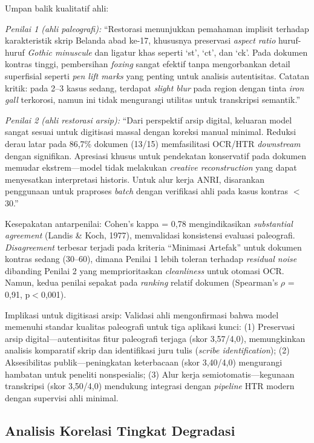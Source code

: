 \documentclass[journal]{IEEEtran}
\begin{document}
Umpan balik kualitatif ahli:

\textit{Penilai 1 (ahli paleografi):} ``Restorasi menunjukkan pemahaman implisit terhadap karakteristik skrip Belanda abad ke-17, khususnya preservasi \textit{aspect ratio} huruf-huruf \textit{Gothic minuscule} dan ligatur khas seperti `st', `ct', dan `ck'. Pada dokumen kontras tinggi, pembersihan \textit{foxing} sangat efektif tanpa mengorbankan detail superfisial seperti \textit{pen lift marks} yang penting untuk analisis autentisitas. Catatan kritik: pada 2--3 kasus sedang, terdapat \textit{slight blur} pada region dengan tinta \textit{iron gall} terkorosi, namun ini tidak mengurangi utilitas untuk transkripsi semantik.''

\textit{Penilai 2 (ahli restorasi arsip):} ``Dari perspektif arsip digital, keluaran model sangat sesuai untuk digitisasi massal dengan koreksi manual minimal. Reduksi derau latar pada 86,7\% dokumen (13/15) memfasilitasi OCR/HTR \textit{downstream} dengan signifikan. Apresiasi khusus untuk pendekatan konservatif pada dokumen memudar ekstrem---model tidak melakukan \textit{creative reconstruction} yang dapat menyesatkan interpretasi historis. Untuk alur kerja ANRI, disarankan penggunaan untuk praproses \textit{batch} dengan verifikasi ahli pada kasus kontras $<$30.''

Kesepakatan antarpenilai: Cohen's kappa = 0,78 mengindikasikan \textit{substantial agreement} (Landis \& Koch, 1977), memvalidasi konsistensi evaluasi paleografi. \textit{Disagreement} terbesar terjadi pada kriteria ``Minimasi Artefak'' untuk dokumen kontras sedang (30--60), dimana Penilai 1 lebih toleran terhadap \textit{residual noise} dibanding Penilai 2 yang memprioritaskan \textit{cleanliness} untuk otomasi OCR. Namun, kedua penilai sepakat pada \textit{ranking} relatif dokumen (Spearman's $\rho$ = 0,91, p$<$0,001).

Implikasi untuk digitisasi arsip: Validasi ahli mengonfirmasi bahwa model memenuhi standar kualitas paleografi untuk tiga aplikasi kunci: (1) Preservasi arsip digital---autentisitas fitur paleografi terjaga (skor 3,57/4,0), memungkinkan analisis komparatif skrip dan identifikasi juru tulis (\textit{scribe identification}); (2) Aksesibilitas publik---peningkatan keterbacaan (skor 3,40/4,0) mengurangi hambatan untuk peneliti nonspesialis; (3) Alur kerja semiotomatis---kegunaan transkripsi (skor 3,50/4,0) mendukung integrasi dengan \textit{pipeline} HTR modern dengan supervisi ahli minimal.

\subsection{Analisis Korelasi Tingkat Degradasi}
\end{document}
